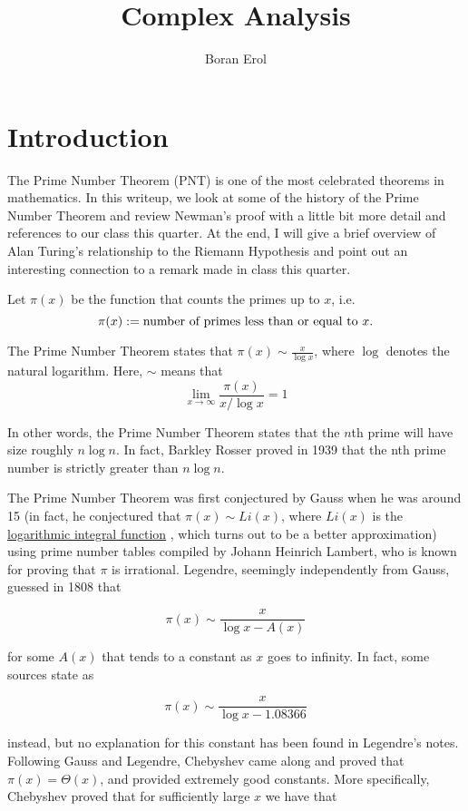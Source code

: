 \documentclass{article}
\title{Complex Analysis}
\author{Boran Erol}
\theoremstyle{definition}
\begin{document}
\maketitle

\section{Introduction}

The Prime Number Theorem (PNT) is one of the most celebrated theorems in mathematics. In this writeup,
we look at some of the history of the Prime Number Theorem and review Newman's proof with a little bit 
more detail and references to our class this quarter. At the end,
I will give a brief overview of Alan Turing's relationship to the Riemann Hypothesis
and point out an interesting connection to a remark made in class this quarter.

Let $ \pi(x) $ be the function that counts the primes up to $ x $, i.e.\[ \pi(x) := \text{number of primes less than or equal to $ x $} .\]

The Prime Number Theorem states that $ \pi(x) \sim \frac{x}{\log x} $, where $\log $ denotes the natural logarithm.
Here, $ \sim $ means that \[ \lim_{x \to \infty} \frac{ \pi(x)}{x/ \log{x}} = 1 \]

In other words, the Prime Number Theorem states that the $n$th prime will have size roughly $ n \log n $.
In fact, Barkley Rosser proved in 1939 that the nth prime number is strictly greater than $ n \log n $.

The Prime Number Theorem was first conjectured by Gauss when he was around 15 (in fact, 
he conjectured that $ \pi(x) \sim Li(x) $, where $ Li(x) $ is the \href{https://en.wikipedia.org/wiki/Logarithmic_integral_function}{logarithmic integral function}
, which turns out to be a better approximation) 
using prime number tables compiled by Johann Heinrich Lambert, who is
known for proving that $ \pi $ is irrational. Legendre, seemingly independently from Gauss,
guessed in 1808 that

\[ \pi(x) \sim \frac{x}{\log x - A(x)} \]

for some $ A(x) $ that tends to a constant as $ x $ goes to infinity. In fact,
some sources state as 

\[ \pi(x) \sim \frac{x}{\log x - 1.08366} \]

instead, but no explanation for this constant has been found in Legendre's notes.
Following Gauss and Legendre, Chebyshev came along and proved that $ \pi(x) = \Theta(x) $,
and provided extremely good constants. More specifically, Chebyshev proved that for 
sufficiently large $ x $ we have that
\end{document}
